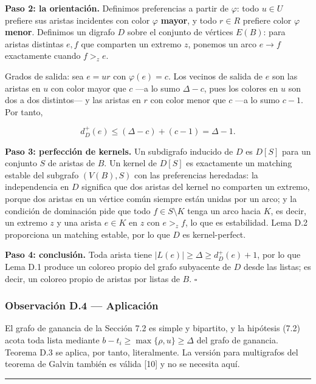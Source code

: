 \documentclass[
  spanish,
  11pt,
  a4paper,
]{article}
\begin{document}
\textbf{Paso 2: la orientación.} Definimos preferencias a partir de \(\varphi\): todo \(u\in U\) prefiere sus aristas incidentes con color \(\varphi\) \textbf{mayor}, y todo \(r\in R\) prefiere color \(\varphi\) \textbf{menor}. Definimos un digrafo \(D\) sobre el conjunto de vértices \(E(B)\): para aristas distintas \(e,f\) que comparten un extremo \(z\), ponemos un arco \(e\to f\) exactamente cuando \(f>_ze\).

Grados de salida: sea \(e=ur\) con \(\varphi(e)=c\). Los vecinos de salida de \(e\) son las aristas en \(u\) con color mayor que \(c\) ---a lo sumo \(\Delta-c\), pues los colores en \(u\) son dos a dos distintos--- y las aristas en \(r\) con color menor que \(c\) ---a lo sumo \(c-1\). Por tanto,

\[
d^+_D(e)\le(\Delta-c)+(c-1)=\Delta-1.
\]

\textbf{Paso 3: perfección de kernels.} Un subdigrafo inducido de \(D\) es \(D[S]\) para un conjunto \(S\) de aristas de \(B\). Un kernel de \(D[S]\) es exactamente un matching estable del subgrafo \((V(B),S)\) con las preferencias heredadas: la independencia en \(D\) significa que dos aristas del kernel no comparten un extremo, porque dos aristas en un vértice común siempre están unidas por un arco; y la condición de dominación pide que todo \(f\in S\setminus K\) tenga un arco hacia \(K\), es decir, un extremo \(z\) y una arista \(e\in K\) en \(z\) con \(e>_zf\), lo que es estabilidad. Lema D.2 proporciona un matching estable, por lo que \(D\) es kernel-perfect.

\textbf{Paso 4: conclusión.} Toda arista tiene \(|L(e)|\ge\Delta\ge d^+_D(e)+1\), por lo que Lema D.1 produce un coloreo propio del grafo subyacente de \(D\) desde las listas; es decir, un coloreo propio de aristas por listas de \(B\). \(\square\)

\subsubsection{Observación D.4 --- Aplicación}\label{observaciuxf3n-d.4-aplicaciuxf3n}

El grafo de ganancia de la Sección 7.2 es simple y bipartito, y la hipótesis (7.2) acota toda lista mediante \(b-t_i\ge\max\{\rho,u\}\ge\Delta\) del grafo de ganancia. Teorema D.3 se aplica, por tanto, literalmente. La versión para multigrafos del teorema de Galvin también es válida {[}10{]} y no se necesita aquí.

\begin{center}\rule{0.5\linewidth}{0.5pt}\end{center}
\end{document}
